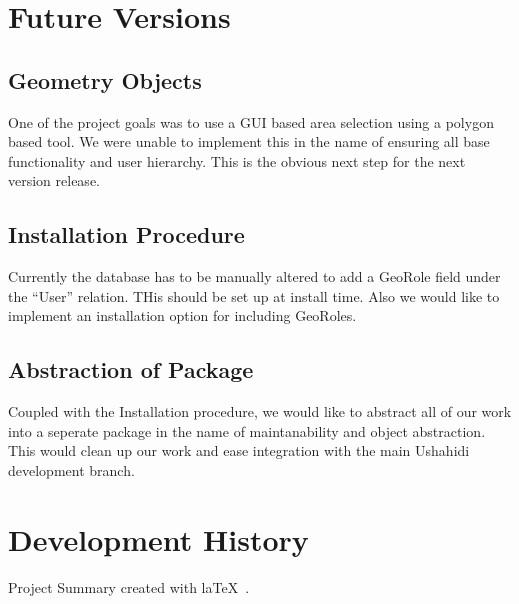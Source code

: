 \documentclass{article}
\begin{document}
\section{Future Versions}
\subsection{Geometry Objects}
One of the project goals was to use a GUI based area selection using a polygon based tool. We were unable to implement this in the name of ensuring all base functionality and user hierarchy. This is the obvious next step for the next version release.
\subsection{Installation Procedure}
Currently the database has to be manually altered to add a GeoRole field under the ``User'' relation. THis should be set up at install time. Also we would like to implement an installation option for including GeoRoles.
\subsection{Abstraction of Package}
Coupled with the Installation procedure, we would like to abstract all of our work into a seperate package in the name of maintanability and object abstraction. This would clean up our work and ease integration with the main Ushahidi development branch.

\section{Development History}

\vfill
\begin{center}
Project Summary created with la\TeX~.
\end{center}
\end{document}
